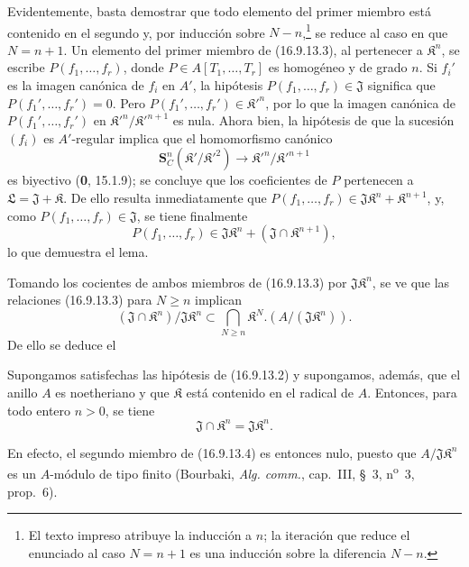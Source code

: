 Evidentemente, basta demostrar que todo elemento del primer miembro está
contenido en el segundo y, por inducción sobre $N-n$,\footnote{El texto
impreso atribuye la inducción a $n$; la iteración que reduce el enunciado al
caso $N=n+1$ es una inducción sobre la diferencia $N-n$.} se reduce al caso en
que $N=n+1$. Un elemento del primer miembro de (16.9.13.3), al pertenecer a
$\mathfrak{K}^n$, se escribe $P(f_1,\ldots,f_r)$, donde
$P\in A[T_1,\ldots,T_r]$ es homogéneo y de grado $n$. Si $f_i'$ es la imagen
canónica de $f_i$ en $A'$, la hipótesis
$P(f_1,\ldots,f_r)\in\mathfrak J$ significa que
$P(f_1',\ldots,f_r')=0$. Pero
$P(f_1',\ldots,f_r')\in\mathfrak{K}'^n$, por lo que la imagen canónica de
$P(f_1',\ldots,f_r')$ en
$\mathfrak{K}'^n/\mathfrak{K}'^{n+1}$ es nula. Ahora bien, la hipótesis de que
la sucesión $(f_i)$ es $A'$-regular implica que el homomorfismo canónico
\[
  \mathbf{S}_C^n(\mathfrak{K}'/\mathfrak{K}'^2)
  \longrightarrow\mathfrak{K}'^n/\mathfrak{K}'^{n+1}
\]
es biyectivo (\textbf 0, 15.1.9); se concluye que los coeficientes de $P$ pertenecen
a $\mathfrak{L}=\mathfrak J+\mathfrak{K}$. De ello resulta inmediatamente
que $P(f_1,\ldots,f_r)\in\mathfrak J\mathfrak{K}^n+\mathfrak{K}^{n+1}$, y,
como $P(f_1,\ldots,f_r)\in\mathfrak J$, se tiene finalmente
\[
  P(f_1,\ldots,f_r)
  \in\mathfrak J\mathfrak{K}^n
    +(\mathfrak J\cap\mathfrak{K}^{n+1}),
\]
lo que demuestra el lema.

Tomando los cocientes de ambos miembros de (16.9.13.3) por
$\mathfrak J\mathfrak{K}^n$, se ve que las relaciones (16.9.13.3) para
$N\geq n$ implican
\[
  (\mathfrak J\cap\mathfrak{K}^n)/\mathfrak J\mathfrak{K}^n
  \subset\bigcap_{N\geq n}\mathfrak{K}^N
    .(A/(\mathfrak J\mathfrak{K}^n)).
  \tag{16.9.13.4}
  \label{IV.16.9.13.4}
\]
De ello se deduce el

\begin{corollary}[16.9.13.5]
\label{IV.16.9.13.5}
Supongamos satisfechas las hipótesis de \textup{(16.9.13.2)} y supongamos, además, que
el anillo $A$ es noetheriano y que $\mathfrak{K}$ está contenido en el radical
de $A$. Entonces, para todo entero $n>0$, se tiene
\[
  \mathfrak J\cap\mathfrak{K}^n=\mathfrak J\mathfrak{K}^n.
  \tag{16.9.13.6}
  \label{IV.16.9.13.6}
\]
\end{corollary}

En efecto, el segundo miembro de (16.9.13.4) es entonces nulo, puesto que
$A/\mathfrak J\mathfrak{K}^n$ es un $A$-módulo de tipo finito (Bourbaki,
\emph{Alg. comm.}, cap.~III, §~3, n\textsuperscript{o}~3, prop.~6).


